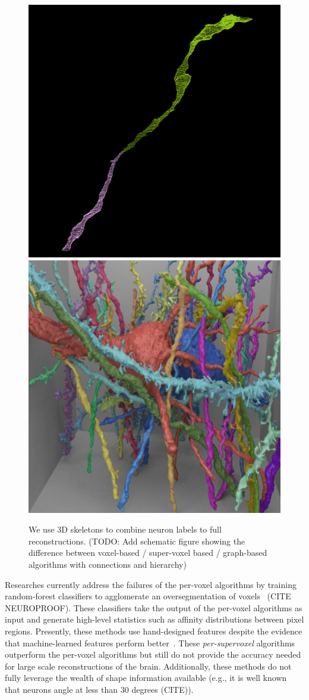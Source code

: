 \begin{figure}
	\centering
	\includegraphics[width=0.42\linewidth]{./figures/merge_candidate1.png}
	\hspace{0.085\linewidth}
	\includegraphics[width=0.42\linewidth]{./figures/intro-cube.png}
	\caption{We use 3D skeletons to combine neuron labels to full reconstructions. (TODO: Add schematic figure showing the difference between voxel-based / super-voxel based / graph-based algorithms with connections and hierarchy)} %
\end{figure}

Researches currently address the failures of the per-voxel algorithms by training random-forest classifiers to agglomerate an oversegmentation of voxels~\cite{nunez2014graph} (CITE NEUROPROOF). 
These classifiers take the output of the per-voxel algorithms as input and generate high-level statistics such as affinity distributions between pixel regions. 
Presently, these methods use hand-designed features despite the evidence that machine-learned features perform better~\cite{bogovic2013learned}. 
These \textit{per-supervoxel} algorithms outperform the per-voxel algorithms but still do not provide the accuracy needed for large scale reconstructions of the brain.
Additionally, these methods do not fully leverage the wealth of shape information available (e.g., it is well known that neurons angle at less than $30$ degrees (CITE)). %


